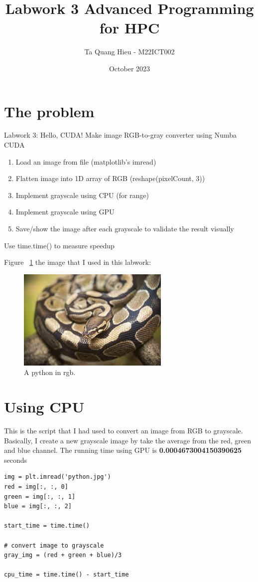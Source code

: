\documentclass{article}
\title{Labwork 3 Advanced Programming for HPC}
\author{Ta Quang Hieu - M22ICT002}
\date{October 2023}
\begin{document}
\maketitle

\section{The problem}
Labwork 3: Hello, CUDA! 
\newline
Make image RGB-to-gray converter using Numba CUDA
\begin{enumerate}
    \item Load an image from file (matplotlib’s imread)
    \item Flatten image into 1D array of RGB (reshape(pixelCount, 3))
    \item Implement grayscale using CPU (for range)
    \item Implement grayscale using GPU
    \item Save/show the image after each grayscale to validate the result visually
\end{enumerate}
Use time.time() to measure speedup

Figure ~\ref{fig:python} the image that I used in this labwork:

\begin{figure}
  \includegraphics[width=\linewidth]{python.jpg}
  \caption{A python in rgb.}
  \label{fig:python}
\end{figure}

\section{Using CPU}
This is the script that I had used to convert an image from RGB to grayscale. Basically, I create a new grayscale image by take the average from the red, green and blue channel. The running time using GPU is \textbf{0.0004673004150390625} seconds
\begin{verbatim}
img = plt.imread('python.jpg')
red = img[:, :, 0]
green = img[:, :, 1]
blue = img[:, :, 2]

start_time = time.time()

# convert image to grayscale
gray_img = (red + green + blue)/3

cpu_time = time.time() - start_time
\end{verbatim}
\end{document}
